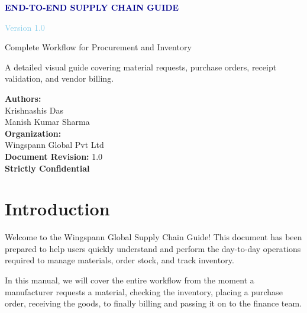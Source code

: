 \documentclass[11pt,a4paper]{article}
\begin{document}
\begin{titlepage}
    \centering
    \vspace*{2cm}
    {\Huge\bfseries\textcolor{darkblue}{END-TO-END SUPPLY CHAIN GUIDE}\par}
    \vspace{0.5cm}
    {\LARGE\textcolor{skyblue}{Version 1.0}\par}
    \vspace{0.3cm}
    {\large\textcolor{codegray}{Complete Workflow for Procurement and Inventory}\par}
    \vspace{2cm}
    {\large A detailed visual guide covering material requests, purchase orders, receipt validation, and vendor billing.\par}
    \vspace{3cm}

    {\normalsize
        \textbf{Authors:}\\
        Krishnashis Das\\
        Manish Kumar Sharma\\[1em]
        \textbf{Organization:}\\
        Wingspann Global Pvt Ltd\\[1em]
        \textbf{Document Revision:} 1.0\\
        \vspace{0.8cm}
        \LARGE\textcolor{alertred}{\textbf{Strictly Confidential}}
    }
\end{titlepage}

\newpage
\tableofcontents
\newpage

\section{Introduction}

Welcome to the Wingspann Global Supply Chain Guide! This document has been prepared to help users quickly understand and perform the day-to-day operations required to manage materials, order stock, and track inventory. 

In this manual, we will cover the entire workflow from the moment a manufacturer requests a material, checking the inventory, placing a purchase order, receiving the goods, to finally billing and passing it on to the finance team. 
\end{document}
